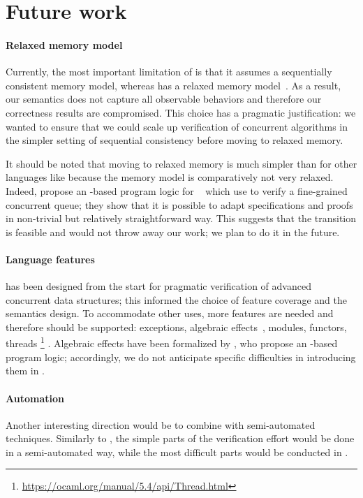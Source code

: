 \section{Future work}

\paragraph{Relaxed memory model}

Currently, the most important limitation of \ZooLang is that it assumes a sequentially consistent memory model, whereas \OCamlFive has a relaxed memory model~\citep{DBLP:conf/pldi/DolanSM18}.
As a result, our semantics does not capture all observable behaviors and therefore our correctness results are compromised.
This choice has a pragmatic justification: we wanted to ensure that we could scale up verification of concurrent algorithms in the simpler setting of sequential consistency before moving to relaxed memory.

It should be noted that moving to relaxed memory is much simpler than for other languages like \C because the \OCamlFive memory model is comparatively not very relaxed.
Indeed, \citet{DBLP:journals/pacmpl/MevelJP20} propose an \Iris-based program logic for \MulticoreOCaml~\citep{DBLP:journals/pacmpl/Sivaramakrishnan20} which \citet{DBLP:journals/pacmpl/MevelJ21} use to verify a fine-grained concurrent queue; they show that it is possible to adapt specifications and proofs in non-trivial but relatively straightforward way.
This suggests that the transition is feasible and would not throw away our work; we plan to do it in the future.

\paragraph{Language features}

\ZooLang has been designed from the start for pragmatic verification of advanced concurrent data structures; this informed the choice of feature coverage and the semantics design.
To accommodate other uses, more features are needed and therefore should be supported: exceptions, algebraic effects~\citep{DBLP:conf/pldi/Sivaramakrishnan21}, modules, functors, threads%
\footnote{
\url{https://ocaml.org/manual/5.4/api/Thread.html}
}%
.
Algebraic effects have been formalized by \citet{DBLP:journals/pacmpl/VilhenaP21}, who propose an \Iris-based program logic; accordingly, we do not anticipate specific difficulties in introducing them in \ZooLang.

\paragraph{Automation}

Another interesting direction would be to combine \Zoo with semi-automated techniques.
Similarly to \WhyThree, the simple parts of the verification effort would be done in a semi-automated way, while the most difficult parts would be conducted in \Rocq.
